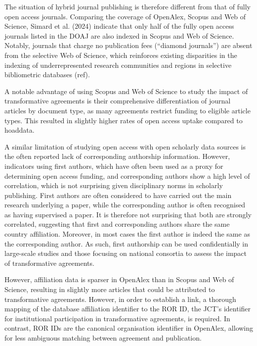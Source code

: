 \documentclass[a4paper,man,floatsintext,longtable,noextraspace,10pt]{apa6}
\begin{document}
The situation of hybrid journal publishing is therefore different from
that of fully open access journals. Comparing the coverage of OpenAlex,
Scopus and Web of Science, Simard et al. (2024) indicate that only half
of the fully open access journals listed in the DOAJ are also indexed in
Scopus and Web of Science. Notably, journals that charge no publication
fees (``diamond journals'') are absent from the selective Web of
Science, which reinforces existing disparities in the indexing of
underrepresented research communities and regions in selective
bibliometric databases (ref).

A notable advantage of using Scopus and Web of Science to study the
impact of transformative agreements is their comprehensive
differentiation of journal articles by document type, as many agreements
restrict funding to eligible article types. This resulted in slightly
higher rates of open access uptake compared to hoaddata.

A similar limitation of studying open access with open scholarly data
sources is the often reported lack of corresponding authorship
information. However, indicators using first authors, which have often
been used as a proxy for determining open access funding, and
corresponding authors show a high level of correlation, which is not
surprising given disciplinary norms in scholarly publishing. First
authors are often considered to have carried out the main research
underlying a paper, while the corresponding author is often recognised
as having supervised a paper. It is therefore not surprising that both
are strongly correlated, suggesting that first and corresponding authors
share the same country affiliation. Moreover, in most cases the first
author is indeed the same as the corresponding author. As such, first
authorship can be used confidentially in large-scale studies and those
focusing on national consortia to assess the impact of transformative
agreements.

However, affiliation data is sparser in OpenAlex than in Scopus and Web
of Science, resulting in slightly more articles that could be attributed
to transformative agreements. However, in order to establish a link, a
thorough mapping of the database affiliation identifier to the ROR ID,
the JCT's identifier for institutional participation in transformative
agreements, is required. In contrast, ROR IDs are the canonical
organisation identifier in OpenAlex, allowing for less ambiguous
matching between agreement and publication.
\end{document}
